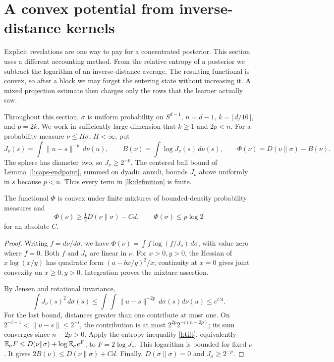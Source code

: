 \section{A convex potential from inverse-distance kernels}\label{lk:section}

Explicit revelations are one way to pay for a concentrated posterior.
This section uses a different accounting method. From the relative
entropy of a posterior we subtract the logarithm of an inverse-distance
average. The resulting functional is convex, so after a block we may
forget the entering state without increasing it. A mixed projection
estimate then charges only the rows that the learner actually saw.

Throughout this section, \(\sigma\) is uniform probability on
\(S^{d-1}\), \(n=d-1\), \(k=\lfloor d/16\rfloor\), and \(p=2k\).
We work in sufficiently large dimension that \(k\ge1\) and \(2p<n\).
For a probability measure \(\nu\le H\sigma\), \(H<\infty\), put
\begin{equation}\label{lk:definition}
 J_\nu(s)=\int\|u-s\|^{-p}\,d\nu(u),\qquad
 B(\nu)=\int\log J_\nu(s)\,d\nu(s),\qquad
 \Phi(\nu)=D(\nu\|\sigma)-B(\nu).
\end{equation}
The sphere has diameter two, so \(J_\nu\ge2^{-p}\). The centered
ball bound of Lemma~\ref{l:caps-endpoint}, summed on dyadic annuli,
bounds \(J_\nu\) above uniformly in \(s\) because \(p<n\).
Thus every term in \eqref{lk:definition} is finite.

\begin{lemma}\label{lk:coercive}
The functional \(\Phi\) is convex under finite mixtures of
bounded-density probability measures and
\[
 \Phi(\nu)\ge\tfrac12D(\nu\|\sigma)-Cd,\qquad
 \Phi(\sigma)\le p\log2
\]
for an absolute \(C\).
\end{lemma}
\begin{proof}
Writing \(f=d\nu/d\sigma\), we have
\(\Phi(\nu)=\int f\log(f/J_\nu)\,d\sigma\), with value zero where
\(f=0\). Both \(f\) and \(J_\nu\) are linear in \(\nu\).
For \(x>0,y>0\), the Hessian of \(x\log(x/y)\) has quadratic form
\((a-bx/y)^2/x\); continuity at \(x=0\) gives joint convexity on
\(x\ge0,y>0\). Integration proves the mixture assertion.

By Jensen and rotational invariance,
\[
 \int J_\nu(s)^2\,d\sigma(s)
 \le\int\!\int\|u-s\|^{-2p}\,d\sigma(s)d\nu(u)
 \le e^{Cd}.
\]
For the last bound, distances greater than one contribute at most
one. On \(2^{-i-1}<\|u-s\|\le2^{-i}\), the contribution is at most
\(2^{2p}2^{-i(n-2p)}\); its sum converges since \(n-2p>0\).
Apply the entropy inequality \eqref{l:tilt}, equivalently
\(\mathbb E_\nu F\le D(\nu\|\sigma)+\log\mathbb E_\sigma e^F\), to
\(F=2\log J_\nu\). This logarithm is bounded for fixed \(\nu\).
It gives \(2B(\nu)\le D(\nu\|\sigma)+Cd\). Finally,
\(D(\sigma\|\sigma)=0\) and \(J_\sigma\ge2^{-p}\).
\end{proof}


